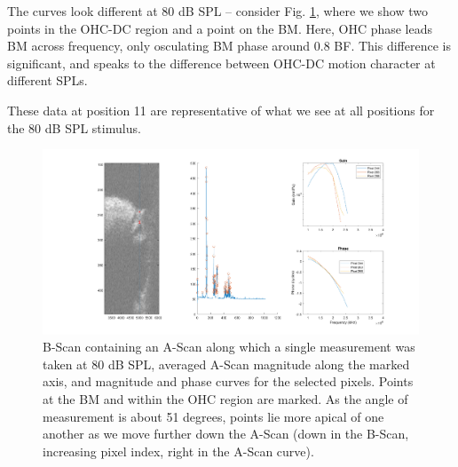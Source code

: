 \documentclass{article}
\begin{document}
\par{The curves look different at 80 dB SPL -- consider Fig. \ref{ohcdcp1180db}, where we show two points in the OHC-DC region and a point on the BM. Here, OHC phase leads BM across frequency, only osculating BM phase around 0.8 BF. This difference is significant, and speaks to the difference between OHC-DC motion character at different SPLs.}
\par{These data at position 11 are representative of what we see at all positions for the 80 dB SPL stimulus.}

\begin{figure}
	\centering
	\includegraphics[width=\textwidth]{Figures/ohcdcp1180dB.png}
	\caption{B-Scan containing an A-Scan along which a single measurement was taken at 80 dB SPL, averaged A-Scan magnitude along the marked axis, and magnitude and phase curves for the selected pixels. Points at the BM and within the OHC region are marked. As the angle of measurement is about 51 degrees, points lie more apical of one another as we move further down the A-Scan (down in the B-Scan, increasing pixel index, right in the A-Scan curve).}
	\label{ohcdcp1180db}
\end{figure}
\end{document}
